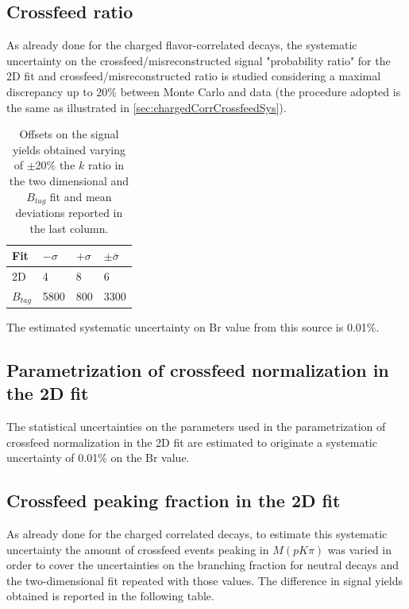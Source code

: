 


\subsection{Crossfeed ratio}

As already done for the charged flavor-correlated decays, the systematic uncertainty on the crossfeed/misreconstructed signal "probability ratio" for the 2D fit 
and crossfeed/misreconstructed ratio is studied  considering a maximal discrepancy up to 20$\%$ between Monte Carlo and data (the procedure adopted is the same as illustrated in \cref{sec:chargedCorrCrossfeedSys}).   


\vspace{0.25 cm}
\begin{table}[H]
\begin{tabular}{ |p{2.5cm}||p{2cm}| p{2cm}|  p{2cm}|}
\hline
    Fit    &  $- \sigma$ &  $+ \sigma$ & $ \pm \bar{\sigma}$\\
 \hline
 2D        &     4  & 8  & 6\\
 $B_{tag}$ &  5800 &  800 & 3300 \\
 \hline
\end{tabular}
\caption{Offsets on the signal yields obtained varying of $\pm$20$\%$ the $k$ ratio in the two dimensional and $B_{tag}$ fit and mean deviations reported in the last column.}
\end{table}
 \vspace{0.25 cm}
The estimated systematic uncertainty on Br value from this source is 0.01$\%$. 
\vspace{0.5 cm}


\subsection{Parametrization of crossfeed normalization in the 2D fit}\label{sec:chargedAnticorrCrossBkgNormalization}

The statistical uncertainties on the parameters used in the  parametrization of crossfeed normalization in  the 2D fit are estimated to originate a systematic uncertainty of 0.01$\%$ on the Br value.


\subsection{Crossfeed peaking fraction in the 2D fit}\label{sec:chargedAnticorrPeakingCrossBkg}

As already done for the charged correlated decays, to estimate this systematic uncertainty the amount of crossfeed events peaking in $M(p K \pi)$  was varied 
in order to cover the uncertainties on the branching fraction for neutral decays and the two-dimensional fit repeated with those values.  The difference in signal yields obtained is reported in the following table. 

